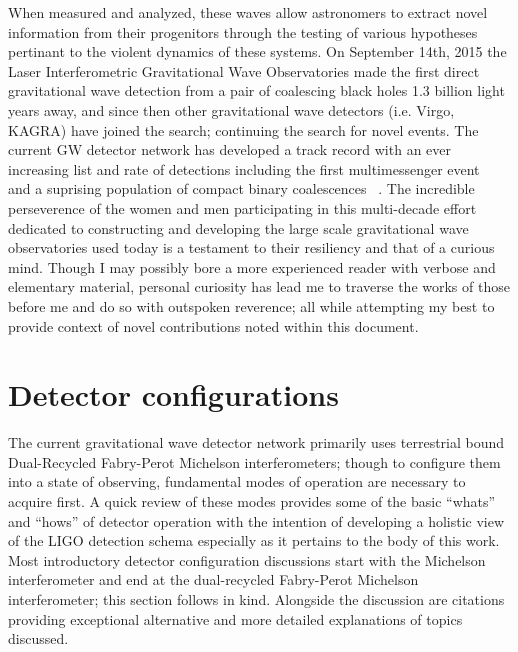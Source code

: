 When measured and analyzed, these waves allow astronomers to extract novel information from their progenitors through the testing of various hypotheses pertinant to the violent dynamics of these systems. On September 14th, 2015 the Laser Interferometric Gravitational Wave Observatories made the first direct gravitational wave detection from a pair of coalescing black holes 1.3 billion light years away, and since then other gravitational wave detectors (i.e. Virgo, KAGRA) have joined the search; continuing the search for novel events. The current GW detector network has developed a track record with an ever increasing list and rate of detections including the first multimessenger event ~\cite{gw170817} and a suprising population of compact binary coalescences ~\cite{nitz:2023}. The incredible perseverence of the women and men participating in this multi-decade effort dedicated to constructing and developing the large scale gravitational wave observatories used today is a testament to their resiliency and that of a curious mind. Though I may possibly bore a more experienced reader with verbose and elementary material, personal curiosity has lead me to traverse the works of those before me and do so with outspoken reverence; all while attempting my best to provide context of novel contributions noted within this document.  

\section{Detector configurations}\label{sec:detcon}
The current gravitational wave detector network primarily uses terrestrial bound Dual-Recycled Fabry-Perot Michelson interferometers; though to configure them into a state of observing, fundamental modes of operation are necessary to acquire first. A quick review of these modes provides some of the basic ``whats'' and ``hows'' of detector operation with the intention of developing a holistic view of the LIGO detection schema especially as it pertains to the body of this work. Most introductory detector configuration discussions start with the Michelson interferometer and end at the dual-recycled Fabry-Perot Michelson interferometer; this section follows in kind. Alongside the discussion are citations providing exceptional alternative and more detailed explanations of topics discussed.

